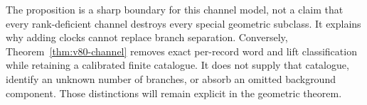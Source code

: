 The proposition is a sharp boundary for this channel model, not a claim
that every rank-deficient channel destroys every special geometric
subclass.  It explains why adding clocks cannot replace branch
separation.  Conversely, Theorem~\ref{thm:v80-channel} removes exact
per-record word and lift classification while retaining a calibrated
finite catalogue.  It does not supply that catalogue, identify an
unknown number of branches, or absorb an omitted background component.
Those distinctions will remain explicit in the geometric theorem.

